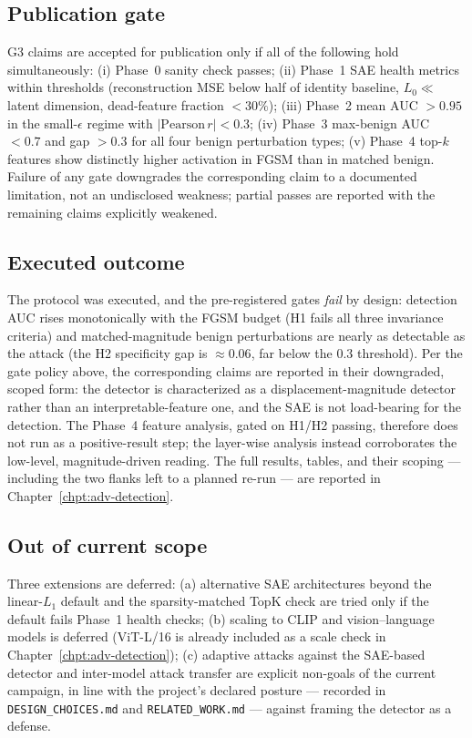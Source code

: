 \documentclass[../ppgc-tese.tex]{subfiles}
\begin{document}
\subsection{Publication gate}
G3 claims are accepted for publication only if all of the following hold simultaneously: (i) Phase~0 sanity check passes; (ii) Phase~1 SAE health metrics within thresholds (reconstruction MSE below half of identity baseline, $L_0 \ll$ latent dimension, dead-feature fraction $< 30\%$); (iii) Phase~2 mean AUC $> 0.95$ in the small-$\epsilon$ regime with $|\mathrm{Pearson}\,r| < 0.3$; (iv) Phase~3 max-benign AUC $< 0.7$ and gap $> 0.3$ for all four benign perturbation types; (v) Phase~4 top-$k$ features show distinctly higher activation in FGSM than in matched benign. Failure of any gate downgrades the corresponding claim to a documented limitation, not an undisclosed weakness; partial passes are reported with the remaining claims explicitly weakened.

\subsection{Executed outcome}
The protocol was executed, and the pre-registered gates \emph{fail} by design:
detection AUC rises monotonically with the FGSM budget (H1 fails all three invariance
criteria) and matched-magnitude benign perturbations are nearly as detectable as the
attack (the H2 specificity gap is $\approx0.06$, far below the $0.3$ threshold).
Per the gate policy above, the corresponding claims are reported in their downgraded,
scoped form: the detector is characterized as a displacement-magnitude detector
rather than an interpretable-feature one, and the SAE is not load-bearing for the
detection. The Phase~4 feature analysis, gated on H1/H2 passing, therefore does not
run as a positive-result step; the layer-wise analysis instead corroborates the
low-level, magnitude-driven reading. The full results, tables, and their scoping ---
including the two flanks left to a planned re-run --- are reported in
Chapter~\ref{chpt:adv-detection}.

\subsection{Out of current scope}
Three extensions are deferred: (a) alternative SAE architectures beyond the linear-$L_1$ default and the sparsity-matched TopK check are tried only if the default fails Phase~1 health checks; (b) scaling to CLIP and vision--language models is deferred (ViT-L/16 is already included as a scale check in Chapter~\ref{chpt:adv-detection}); (c) adaptive attacks against the SAE-based detector and inter-model attack transfer are explicit non-goals of the current campaign, in line with the project's declared posture --- recorded in \texttt{DESIGN\_CHOICES.md} and \texttt{RELATED\_WORK.md} --- against framing the detector as a defense.
\end{document}
